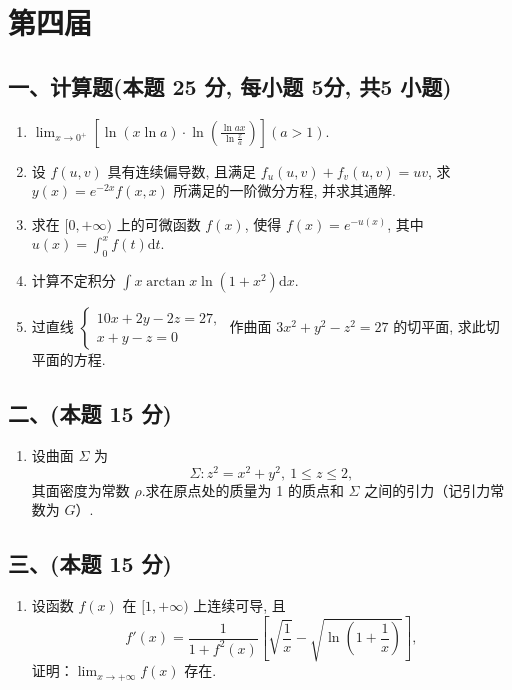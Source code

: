 \newpage
\section{第四届}

\subsection*{一、计算题(本题 25 分,  每小题 5分,  共5 小题)}
\begin{enumerate}
    \item $\displaystyle\lim_{x\rightarrow 0^+}\left[\ln(x\ln a)\cdot\ln\left(\frac{\ln ax}{\ln\frac{x}{a}}\right)\right] (a>1)$.
    \item 设 $f(u,v)$ 具有连续偏导数, 且满足 $f_u(u,v)+f_v(u,v)=uv$, 求 $y(x)=e^{-2x}f(x,x)$ 所满足的一阶微分方程, 并求其通解.
    \item 求在 $[0,+\infty)$ 上的可微函数 $f(x)$, 使得 $f(x)=e^{-u(x)}$, 其中 $u(x)=\displaystyle\int_0^x f(t)\mathrm{d}t$.
    \item 计算不定积分 $\displaystyle\int x\arctan x\ln(1+x^2)\mathrm{d}x$.
    \item 过直线 $\begin{cases}
                  10x+2y-2z=27, \\
                  x+y-z=0
              \end{cases}$ 作曲面 $3x^2+y^2-z^2=27$ 的切平面, 求此切平面的方程.
\end{enumerate}

\subsection*{二、(本题 15 分)}
\begin{enumerate}[start=6]
    \item 设曲面 $\Sigma$ 为
          \[
              \Sigma: z^2=x^2+y^2, \ 1\leqslant z\leqslant 2,
          \]
          其面密度为常数 $\rho$.求在原点处的质量为 1 的质点和 $\Sigma$ 之间的引力（记引力常数为 $G$）.
\end{enumerate}

\subsection*{三、(本题 15 分)}
\begin{enumerate}[start=7]
    \item 设函数 $f(x)$ 在 $[1,+\infty)$ 上连续可导, 且
          \[
              f'(x)=\frac{1}{1+f^2(x)}\left[\sqrt{\frac{1}{x}}-\sqrt{\ln\left(1+\frac{1}{x}\right)}\right],
          \]
          证明：$\displaystyle\lim_{x\rightarrow+\infty}f(x)$ 存在.
\end{enumerate}

